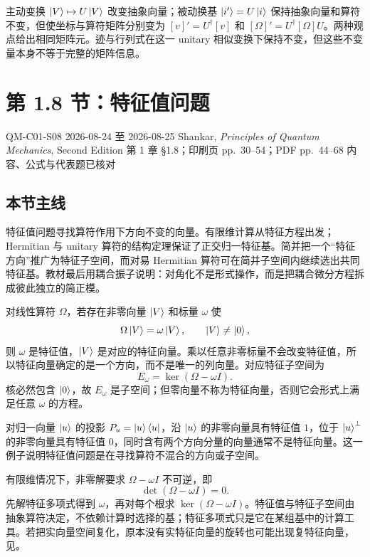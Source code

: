 主动变换 $\left|V\right\rangle\mapsto U\left|V\right\rangle$ 改变抽象向量；被动换基 $\left|i'\right\rangle=U\left|i\right\rangle$ 保持抽象向量和算符不变，但使坐标与算符矩阵分别变为 $[v]'=U^\dagger[v]$ 和 $[\Omega]'=U^\dagger[\Omega]U$。两种观点给出相同矩阵元。迹与行列式在这一 unitary 相似变换下保持不变，但这些不变量本身不等于完整的矩阵信息。

\section{第 1.8 节：特征值问题}
\label{section:QM-C01-S08}

\studymeta
  {QM-C01-S08}
  {2026-08-24 至 2026-08-25}
  {Shankar, \textit{Principles of Quantum Mechanics}, Second Edition}
  {第 1 章 \S 1.8；印刷页 pp.~30--54；PDF pp.~44--68}
  {内容、公式与代表题已核对}

\subsection{本节主线}

特征值问题寻找算符作用下方向不变的向量。有限维计算从特征方程出发；Hermitian 与 unitary 算符的结构定理保证了正交归一特征基。简并把一个“特征方向”推广为特征子空间，而对易 Hermitian 算符可在简并子空间内继续选出共同特征基。教材最后用耦合振子说明：对角化不是形式操作，而是把耦合微分方程拆成彼此独立的简正模。


对线性算符 $\Omega$，若存在非零向量 $\left|V\right\rangle$ 和标量 $\omega$ 使
\begin{equation}
  \Omega\left|V\right\rangle=\omega\left|V\right\rangle,
  \qquad \left|V\right\rangle\neq\left|0\right\rangle,
  \label{eq:QM-C01-S08-eigen-equation}
\end{equation}
则 $\omega$ 是特征值，$\left|V\right\rangle$ 是对应的特征向量。乘以任意非零标量不会改变特征值，所以特征向量确定的是一个方向，而不是唯一的列向量。对应特征子空间为
\begin{equation}
  E_\omega=\ker(\Omega-\omega I).
  \label{eq:QM-C01-S08-eigenspace}
\end{equation}
核必然包含 $\left|0\right\rangle$，故 $E_\omega$ 是子空间；但零向量不称为特征向量，否则它会形式上满足任意 $\omega$ 的方程。

对归一向量 $\left|u\right\rangle$ 的投影 $P_u=\left|u\right\rangle\left\langle u\right|$，沿 $\left|u\right\rangle$ 的非零向量具有特征值 $1$，位于 $\left|u\right\rangle^\perp$ 的非零向量具有特征值 $0$，同时含有两个方向分量的向量通常不是特征向量。这一例子说明特征值问题是在寻找算符不混合的方向或子空间。

有限维情况下，非零解要求 $\Omega-\omega I$ 不可逆，即
\begin{equation}
  \det(\Omega-\omega I)=0.
  \label{eq:QM-C01-S08-characteristic-equation}
\end{equation}
先解特征多项式得到 $\omega$，再对每个根求 $\ker(\Omega-\omega I)$。特征值与特征子空间由抽象算符决定，不依赖计算时选择的基；特征多项式只是它在某组基中的计算工具。若把实向量空间复化，原本没有实特征向量的旋转也可能出现复特征向量，见。

